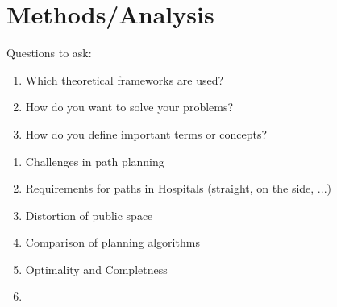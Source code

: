 \chapter{Methods/Analysis}
\label{sec:methods}
Questions to ask:
\begin{enumerate}
    \item Which theoretical frameworks are used? 
    \item How do you want to solve your problems?
    \item How do you define important terms or concepts?
\end{enumerate}

\begin{enumerate}
    \item Challenges in path planning
    \item Requirements for paths in Hospitals (straight, on the side, ...)
    \item Distortion of public space
    \item Comparison of planning algorithms
    \item Optimality and Completness
    \item 
\end{enumerate}